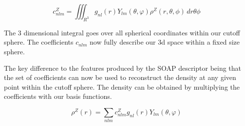 $$ c_{nlm}^Z = \iiint_{R^3} g_{nl}(r) Y_{lm}(\theta, \varphi) \rho^Z(r, \theta, \phi)  \,dr\theta\phi   $$

The 3 dimensional integral goes over all spherical coordinates within our cutoff sphere.
The coefficients $c_{nlm}$ now fully describe our 3d space within a fixed size sphere.

The key difference to the features produced by the SOAP descriptor being that the set of coefficients 
can now be used to reconstruct the density at any given point within the cutoff sphere.
The density can be obtained by multiplying the coefficients with our basis functions.

$$ \rho^Z(r) = \sum_{nlm} c^Z_{nlm} g_{nl}(r) Y_{lm}(\theta, \varphi) $$
